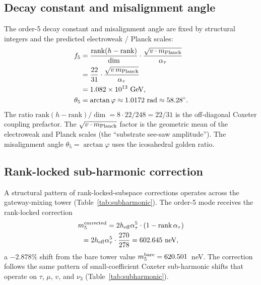 ﻿\documentclass[reprint,amsmath,amssymb,aps,prd,longbibliography,floatfix]{revtex4-2}
\providecommand{\degree}{^{\circ}}
\begin{document}
\subsection{Decay constant and misalignment angle}

The order-5 decay constant and misalignment angle are fixed by
structural integers and the predicted electroweak / Planck scales:
\begin{align}
f_5 &= \frac{\text{rank}(h - \text{rank})}{\dim} \cdot
       \frac{\sqrt{v \cdot m_{\rm Planck}}}{\alpha_\tau} \notag \\
    &= \frac{22}{31} \cdot \frac{\sqrt{v\,m_{\rm Planck}}}{\alpha_\tau} \notag \\
    &= 1.082 \times 10^{13}~\text{GeV},
\label{eq:f5}\\
\theta_5 &= \arctan \varphi \approx 1.0172~\text{rad} \approx 58.28\degree.
\label{eq:theta5}
\end{align}
The ratio $\text{rank}(h-\text{rank})/\dim = 8 \cdot 22 / 248 = 22/31$
is the off-diagonal Coxeter coupling prefactor. The
$\sqrt{v \cdot m_{\rm Planck}}$ factor is the geometric mean of the
electroweak and Planck scales (the ``substrate see-saw amplitude'').
The misalignment angle $\theta_5 = \arctan\varphi$ uses the icosahedral
golden ratio.

\subsection{Rank-locked sub-harmonic correction}

A structural pattern of rank-locked-subspace corrections operates across
the gateway-mixing tower (Table~\ref{tab:subharmonic}). The order-5
mode receives the rank-locked correction
\begin{multline}
m_5^{\rm corrected} = 2 h_{\rm eff} \alpha_\tau^5 \cdot
(1 - \text{rank}\,\alpha_\tau) \\
= 2 h_{\rm eff} \alpha_\tau^5 \cdot \frac{270}{278}
= 602.645~\text{neV},
\label{eq:m5corr}
\end{multline}
a $-2.878\%$ shift from the bare tower value
$m_5^{\rm bare} = 620.501$~neV. The correction follows the same
pattern of small-coefficient Coxeter sub-harmonic shifts that operate
on $\tau$, $\mu$, $v$, and $\nu_3$ (Table~\ref{tab:subharmonic}).
\end{document}
